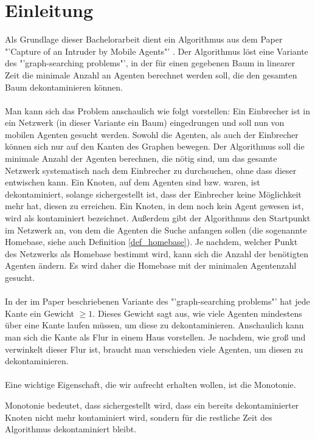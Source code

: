 \section{Einleitung}

Als Grundlage dieser Bachelorarbeit dient ein Algorithmus aus dem Paper "'Capture of an Intruder by Mobile Agents"' \cite{cima_paper}. Der Algorithmus löst eine Variante des "'graph-searching problems"', in der für einen gegebenen Baum in linearer Zeit die minimale Anzahl an Agenten berechnet werden soll, die den gesamten Baum dekontaminieren können.
\\
\\
Man kann sich das Problem anschaulich wie folgt vorstellen: Ein Einbrecher ist in ein Netzwerk (in dieser Variante ein Baum) eingedrungen und soll nun von mobilen Agenten gesucht werden. Sowohl die Agenten, als auch der Einbrecher können sich nur auf den Kanten des Graphen bewegen. Der Algorithmus soll die minimale Anzahl der Agenten berechnen, die nötig sind, um das gesamte Netzwerk systematisch nach dem Einbrecher zu durchsuchen, ohne dass dieser entwischen kann. Ein Knoten, auf dem Agenten sind bzw. waren, ist dekontaminiert, solange sichergestellt ist, dass der Einbrecher keine Möglichkeit mehr hat, diesen zu erreichen. Ein Knoten, in dem noch kein Agent gewesen ist, wird als kontaminiert bezeichnet. Außerdem gibt der Algorithmus den Startpunkt im Netzwerk an, von dem die Agenten die Suche anfangen sollen (die sogenannte Homebase, siehe auch Definition \ref{def_homebase}). Je nachdem, welcher Punkt des Netzwerks als Homebase bestimmt wird, kann sich die Anzahl der benötigten Agenten ändern. Es wird daher die Homebase mit der minimalen Agentenzahl gesucht.
\\
\\
In der im Paper beschriebenen Variante des "'graph-searching problems"' hat jede Kante ein Gewicht $\geq 1$. Dieses Gewicht sagt aus, wie viele Agenten mindestens über eine Kante laufen müssen, um diese zu dekontaminieren. Anschaulich kann man sich die Kante als Flur in einem Haus vorstellen. Je nachdem, wie groß und verwinkelt dieser Flur ist, braucht man verschieden viele Agenten, um diesen  zu dekontaminieren.
\\
\\
Eine wichtige Eigenschaft, die wir aufrecht erhalten wollen, ist die Monotonie. 
\begin{mydef}\label{def_monotonie}
	Monotonie bedeutet, dass sichergestellt wird, dass ein bereits dekontaminierter Knoten nicht mehr kontaminiert wird, sondern für die restliche Zeit des Algorithmus dekontaminiert bleibt.
\end{mydef}
